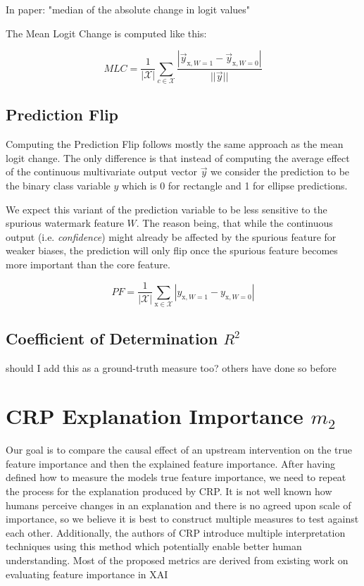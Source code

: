 In \cite{Sixt2022a} paper: "median of the absolute change in logit values"

The Mean Logit Change is computed like this:

\begin{equation}
\displaystyle 
MLC =\frac{1}{|\mathcal{X}|} \sum_{c \in \mathcal{X}} \frac{|\vec{y}_{\mathrm{x}, W=1}- \vec{y}_{\mathrm{x}, W=0} |}{||\vec{y}||}
\end{equation}

\subsection{Prediction Flip}
Computing the Prediction Flip follows mostly the same approach as the mean logit change. The only difference is that instead of computing the average effect of the continuous multivariate output vector $\vec{y}$ we consider the prediction to be the binary class variable $y$ which is 0 for rectangle and 1 for ellipse predictions. 

We expect this variant of the prediction variable to be less sensitive to the spurious watermark feature $W$. The reason being, that while the continuous output (i.e. \textit{confidence}) might already be affected by the spurious feature for weaker biases, the prediction will only flip once the spurious feature becomes more important than the core feature. 

\begin{equation}
\displaystyle 
PF =\frac{1}{|\mathcal{X}|} \sum_{\mathrm{x} \in \mathcal{X}} |y_{\mathrm{x}, W=1} - y_{\mathrm{x}, W=0} |
\end{equation}

\subsection{Coefficient of Determination $R^2$}
should I add this as a ground-truth measure too? others have done so before

\section{CRP Explanation Importance $m_2$}\label{section:measure}
Our goal is to compare the causal effect of an upstream intervention on the true feature importance and then the explained feature importance. After having defined how to measure the models true feature importance, we need to repeat the process for the explanation produced by CRP. It is not well known how humans perceive changes in an explanation and there is no agreed upon scale of importance, so we believe it is best to construct multiple measures to test against each other. {\color{gray} Additionally, the authors of CRP introduce multiple interpretation techniques using this method which potentially enable better human understanding. }Most of the proposed metrics are derived from existing work on evaluating feature importance in XAI \cite{Arras2022} \\

